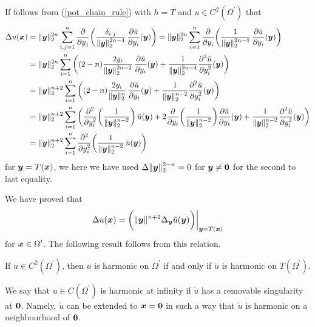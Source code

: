 If follows from (\ref{pot_chain_rule}) with $h=T$ and
$\displaystyle u\in C^2(\Omega^{\prime})$ that
\begin{align*}
\Delta u (\VEC{x})
&= \|\VEC{y}\|_2^{2n}  \sum_{i,j=1}^n
\pdfdx{ \left( \frac{ \delta_{i,j}}{\|\VEC{y}\|_2^{2n-4}}
\, \pdydx{\breve{u}}{y_i}(\VEC{y})\right)}{y_j}
= \|\VEC{y}\|_2^{2n}  \sum_{i=1}^n
\pdfdx{ \left( \frac{1}{\|\VEC{y}\|_2^{2n-4}}
\, \pdydx{\breve{u}}{y_i}(\VEC{y})\right)}{y_i} \\
&= \|\VEC{y}\|_2^{2n}  \sum_{i=1}^n
\left( (2-n) \frac{2y_i}{\|\VEC{y}\|_2^{2n-2}}\,
\pdydx{\breve{u}}{y_i}(\VEC{y})
+ \frac{1}{\|\VEC{y}\|_2^{2n-4}} \pdydxn{\breve{u}}{y_i}{2} (\VEC{y})
\right) \\
&= \|\VEC{y}\|_2^{n+2}  \sum_{i=1}^n
\left( (2-n) \frac{2y_i}{\|\VEC{y}\|_2^n}\,
\pdydx{\breve{u}}{y_i}(\VEC{y})
+ \frac{1}{\|\VEC{y}\|_2^{n-2}} \pdydxn{\breve{u}}{y_i}{2} (\VEC{y})
\right) \\
&= \|\VEC{y}\|_2^{n+2}  \sum_{i=1}^n
\left( \pdfdxn{ \left( \frac{1}{\|\VEC{y}\|_2^{n-2}} \right)}{y_i}{2}
  \, \breve{u}(\VEC{y})
+ 2\pdfdx{ \left( \frac{1}{\|\VEC{y}\|_2^{n-2}} \right)}{y_i}
\pdydx{\breve{u}}{y_i}(\VEC{y})
+ \frac{1}{\|\VEC{y}\|_2^{n-2}} \pdydxn{\breve{u}}{y_i}{2} (\VEC{y})
\right) \\
&= \|\VEC{y}\|_2^{n+2}  \sum_{i=1}^n
\pdfdxn{ \left( \frac{1}{\|\VEC{y}\|_2^{n-2}}
\, \breve{u}(\VEC{y}) \right)}{y_i}{2}
\end{align*}
for $\VEC{y} = T(\VEC{x})$, we here we have used
$\displaystyle \Delta \|\VEC{y}\|_2^{2-n} = 0$ for
$\VEC{y} \neq \VEC{0}$ for the
second to last equality.

We have proved that
\[
\Delta u (\VEC{x}) =
\bigg( \|\VEC{y}\|^{n+2} \Delta_{\VEC{y}} \tilde{u}(\VEC{y}) \bigg)
\bigg|_{\VEC{y} = T(\VEC{x})}
\]
for $\VEC{x} \in \Omega^{\prime}$.
The following result follows from this relation.

\begin{prop} \label{pot_u_ut_harm}
If $\displaystyle u\in C^2(\Omega^{\prime})$, then $u$ is harmonic on
$\displaystyle \Omega^{\prime}$
if and only if $\tilde{u}$ is harmonic on $\displaystyle T(\Omega^{\prime})$.
\end{prop}

\begin{defn}
We say that $\displaystyle u\in C(\Omega^{\prime})$ is harmonic at
infinity if $\tilde{u}$ has a removable singularity at $\VEC{0}$.
Namely, $\tilde{u}$ can be extended to $\VEC{x}=\VEC{0}$ in such a way
that $\tilde{u}$ is harmonic on a neighbourhood of $\VEC{0}$.
\end{defn}

